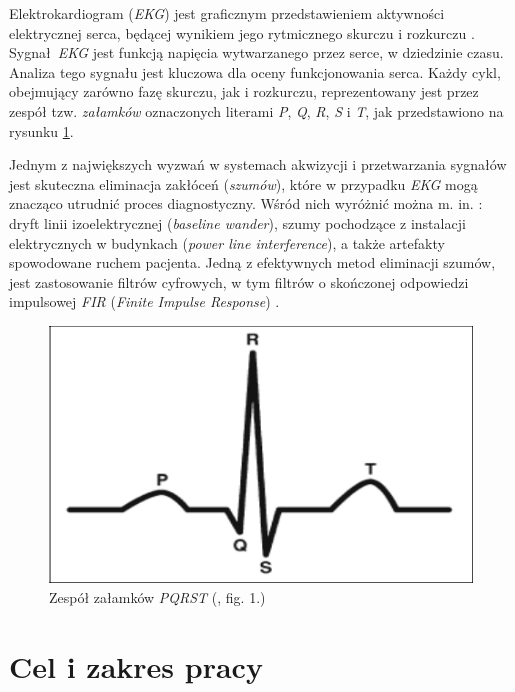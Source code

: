 \newpage

Elektrokardiogram (\textit{EKG}) jest graficznym przedstawieniem aktywności elektrycznej serca, będącej wynikiem jego rytmicznego
skurczu i rozkurczu \cite{Limaye2016}. Sygnał \textit{EKG} jest funkcją napięcia wytwarzanego przez serce, w dziedzinie czasu.
Analiza tego sygnału jest kluczowa dla oceny funkcjonowania serca.
Każdy cykl, obejmujący zarówno fazę skurczu, jak i rozkurczu, reprezentowany jest przez zespół tzw. \textit{załamków} 
oznaczonych literami \textit{P}, \textit{Q}, \textit{R}, \textit{S} i \textit{T}, jak przedstawiono na rysunku \ref{fig:pqrst}.

Jednym z największych wyzwań w systemach akwizycji i przetwarzania sygnałów jest skuteczna eliminacja zakłóceń (\textit{szumów}), 
które w przypadku \textit{EKG} mogą znacząco utrudnić proces diagnostyczny. 
Wśród nich wyróżnić można m. in. \cite{Limaye2016}: dryft linii izoelektrycznej (\textit{baseline wander}), 
szumy pochodzące z instalacji elektrycznych w budynkach (\textit{power line interference}),
a także artefakty spowodowane ruchem pacjenta. Jedną z efektywnych metod eliminacji szumów, jest zastosowanie filtrów cyfrowych, 
w tym filtrów o skończonej odpowiedzi impulsowej \textit{FIR} (\textit{Finite Impulse Response}) \cite{Tompkins1993}.

\begin{figure}[h!]
    \centering
    \includegraphics[scale=0.6]{pl/media/pqrst.png}
    \caption{Zespół załamków \textit{PQRST} (\cite{Limaye2016}, fig. 1.)}
    \label{fig:pqrst}
\end{figure}

\newpage

\section*{Cel i zakres pracy}

